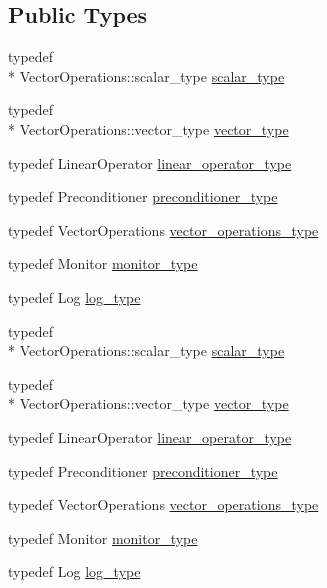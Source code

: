 \subsection*{Public Types}
\begin{DoxyCompactItemize}
\item 
typedef \\*
Vector\-Operations\-::scalar\-\_\-type \hyperlink{classnumerical__algos_1_1lin__solvers_1_1bicgstabl_a2756ac0272be9f905269641d9f74bb8e}{scalar\-\_\-type}
\item 
typedef \\*
Vector\-Operations\-::vector\-\_\-type \hyperlink{classnumerical__algos_1_1lin__solvers_1_1bicgstabl_add3b80f2998237878d4cbe24478bcf53}{vector\-\_\-type}
\item 
typedef Linear\-Operator \hyperlink{classnumerical__algos_1_1lin__solvers_1_1bicgstabl_a01e654bee784fc6e5fae7b02dd408523}{linear\-\_\-operator\-\_\-type}
\item 
typedef Preconditioner \hyperlink{classnumerical__algos_1_1lin__solvers_1_1bicgstabl_ae6594eb67e1314591b179bcf6426cd42}{preconditioner\-\_\-type}
\item 
typedef Vector\-Operations \hyperlink{classnumerical__algos_1_1lin__solvers_1_1bicgstabl_a10544b2c65e7fcf5ff71a3049c19734c}{vector\-\_\-operations\-\_\-type}
\item 
typedef Monitor \hyperlink{classnumerical__algos_1_1lin__solvers_1_1bicgstabl_a220cc0b13fdb1f9cbd9dcbfc6aaaccd8}{monitor\-\_\-type}
\item 
typedef Log \hyperlink{classnumerical__algos_1_1lin__solvers_1_1bicgstabl_af655ab52679d5d959cccf86e56a33d63}{log\-\_\-type}
\item 
typedef \\*
Vector\-Operations\-::scalar\-\_\-type \hyperlink{classnumerical__algos_1_1lin__solvers_1_1bicgstabl_a2756ac0272be9f905269641d9f74bb8e}{scalar\-\_\-type}
\item 
typedef \\*
Vector\-Operations\-::vector\-\_\-type \hyperlink{classnumerical__algos_1_1lin__solvers_1_1bicgstabl_add3b80f2998237878d4cbe24478bcf53}{vector\-\_\-type}
\item 
typedef Linear\-Operator \hyperlink{classnumerical__algos_1_1lin__solvers_1_1bicgstabl_a01e654bee784fc6e5fae7b02dd408523}{linear\-\_\-operator\-\_\-type}
\item 
typedef Preconditioner \hyperlink{classnumerical__algos_1_1lin__solvers_1_1bicgstabl_ae6594eb67e1314591b179bcf6426cd42}{preconditioner\-\_\-type}
\item 
typedef Vector\-Operations \hyperlink{classnumerical__algos_1_1lin__solvers_1_1bicgstabl_a10544b2c65e7fcf5ff71a3049c19734c}{vector\-\_\-operations\-\_\-type}
\item 
typedef Monitor \hyperlink{classnumerical__algos_1_1lin__solvers_1_1bicgstabl_a220cc0b13fdb1f9cbd9dcbfc6aaaccd8}{monitor\-\_\-type}
\item 
typedef Log \hyperlink{classnumerical__algos_1_1lin__solvers_1_1bicgstabl_af655ab52679d5d959cccf86e56a33d63}{log\-\_\-type}
\end{DoxyCompactItemize}
